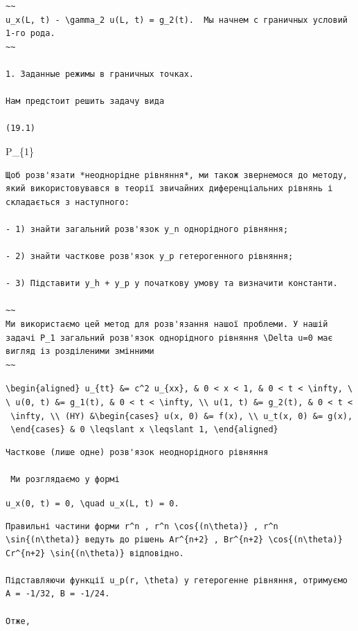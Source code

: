 \documentclass[
  ukrainian,
]{article}
\begin{document}
\begin{verbatim}
~~
u_x(L, t) - \gamma_2 u(L, t) = g_2(t).  Мы начнем с граничных условий 1-го рода.
~~

1. Заданные режимы в граничных точках.

Нам предстоит решить задачу вида

(19.1)
\end{verbatim}

P\_\{1\}

\begin{verbatim}
Щоб розв'язати *неоднорідне рівняння*, ми також звернемося до методу, який використовувався в теорії звичайних диференціальних рівнянь і складається з наступного:

- 1) знайти загальний розв'язок y_n однорідного рівняння;

- 2) знайти часткове розв'язок y_p гетерогенного рівняння;

- 3) Підставити y_h + y_p у початкову умову та визначити константи.

~~
Ми використаємо цей метод для розв'язання нашої проблеми. У нашій задачі P_1 загальний розв'язок однорідного рівняння \Delta u=0 має вигляд із розділеними змінними
~~
\end{verbatim}

\texttt{\textbackslash{}begin\{aligned\}\ u\_\{tt\}\ \&=\ c\^{}2\ u\_\{xx\},\ \&\ 0\ \textless{}\ x\ \textless{}\ 1,\ \&\ 0\ \textless{}\ t\ \textless{}\ \textbackslash{}infty,\ \textbackslash{}\textbackslash{}\ u(0,\ t)\ \&=\ g\_1(t),\ \&\ 0\ \textless{}\ t\ \textless{}\ \textbackslash{}infty,\ \textbackslash{}\textbackslash{}\ u(1,\ t)\ \&=\ g\_2(t),\ \&\ 0\ \textless{}\ t\ \textless{}\ \textbackslash{}infty,\ \textbackslash{}\textbackslash{}\ (HY)\ \&\textbackslash{}begin\{cases\}\ u(x,\ 0)\ \&=\ f(x),\ \textbackslash{}\textbackslash{}\ u\_t(x,\ 0)\ \&=\ g(x),\ \textbackslash{}end\{cases\}\ \&\ 0\ \textbackslash{}leqslant\ x\ \textbackslash{}leqslant\ 1,\ \textbackslash{}end\{aligned\}}

\begin{verbatim}
Часткове (лише одне) розв'язок неоднорідного рівняння

 Ми розглядаємо у формі
\end{verbatim}

\texttt{u\_x(0,\ t)\ =\ 0,\ \textbackslash{}quad\ u\_x(L,\ t)\ =\ 0.}

\begin{verbatim}
Правильні частини форми r^n , r^n \cos{(n\theta)} , r^n \sin{(n\theta)} ведуть до рішень Ar^{n+2} , Br^{n+2} \cos{(n\theta)} Cr^{n+2} \sin{(n\theta)} відповідно.

Підставляючи функції u_p(r, \theta) у гетерогенне рівняння, отримуємо A = -1/32, B = -1/24.

Отже,
\end{verbatim}
\end{document}
